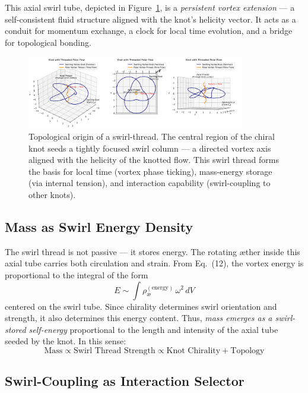 \documentclass[a4paper,12pt]{article}
\begin{document}
    This axial swirl tube, depicted in Figure~\ref{fig:knotthreaded}, is a \textit{persistent vortex extension} — a self-consistent fluid structure aligned with the knot’s helicity vector. It acts as a conduit for momentum exchange, a clock for local time evolution, and a bridge for topological bonding.

    \begin{figure}[H]
        \centering
        \includegraphics[width=0.85\textwidth]{KnotThreadedPolarFlow}
        \caption{Topological origin of a swirl-thread. The central region of the chiral knot seeds a tightly focused swirl column — a directed vortex axis aligned with the helicity of the knotted flow. This swirl thread forms the basis for local time (vortex phase ticking), mass-energy storage (via internal tension), and interaction capability (swirl-coupling to other knots).}
        \label{fig:knotthreaded}
    \end{figure}

    \subsection{Mass as Swirl Energy Density}

    The swirl thread is not passive — it stores energy. The rotating æther inside this axial tube carries both circulation and strain. From Eq.~(12), the vortex energy is proportional to the integral of the form
    \[
        E \sim \int \rho_{\text{\ae}}^{(\text{energy})} \, \omega^2 \, dV
    \]
    centered on the swirl tube. Since chirality determines swirl orientation and strength, it also determines this energy content. Thus, \textit{mass emerges as a swirl-stored self-energy} proportional to the length and intensity of the axial tube seeded by the knot. In this sense:
    \[
        \text{Mass} \propto \text{Swirl Thread Strength} \propto \text{Knot Chirality} + \text{Topology}
    \]

    \subsection{Swirl-Coupling as Interaction Selector}
\end{document}
